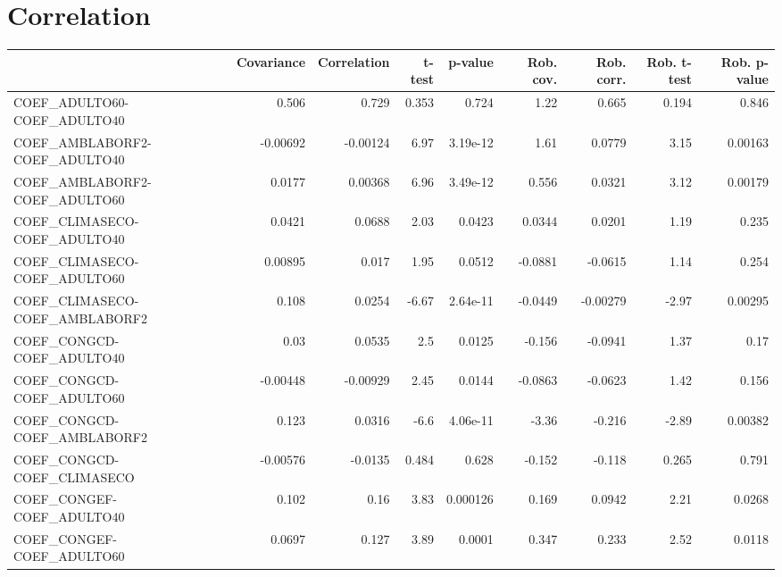 \section{Correlation}
\begin{tabular}{lrrrrrrrr}
\toprule
{} &  Covariance &  Correlation &   t-test &  p-value &  Rob. cov. &  Rob. corr. &  Rob. t-test &  Rob. p-value \\
\midrule
COEF\_ADULTO60-COEF\_ADULTO40           &       0.506 &        0.729 &    0.353 &    0.724 &       1.22 &       0.665 &        0.194 &         0.846 \\
COEF\_AMBLABORF2-COEF\_ADULTO40         &    -0.00692 &     -0.00124 &     6.97 & 3.19e-12 &       1.61 &      0.0779 &         3.15 &       0.00163 \\
COEF\_AMBLABORF2-COEF\_ADULTO60         &      0.0177 &      0.00368 &     6.96 & 3.49e-12 &      0.556 &      0.0321 &         3.12 &       0.00179 \\
COEF\_CLIMASECO-COEF\_ADULTO40          &      0.0421 &       0.0688 &     2.03 &   0.0423 &     0.0344 &      0.0201 &         1.19 &         0.235 \\
COEF\_CLIMASECO-COEF\_ADULTO60          &     0.00895 &        0.017 &     1.95 &   0.0512 &    -0.0881 &     -0.0615 &         1.14 &         0.254 \\
COEF\_CLIMASECO-COEF\_AMBLABORF2        &       0.108 &       0.0254 &    -6.67 & 2.64e-11 &    -0.0449 &    -0.00279 &        -2.97 &       0.00295 \\
COEF\_CONGCD-COEF\_ADULTO40             &        0.03 &       0.0535 &      2.5 &   0.0125 &     -0.156 &     -0.0941 &         1.37 &          0.17 \\
COEF\_CONGCD-COEF\_ADULTO60             &    -0.00448 &     -0.00929 &     2.45 &   0.0144 &    -0.0863 &     -0.0623 &         1.42 &         0.156 \\
COEF\_CONGCD-COEF\_AMBLABORF2           &       0.123 &       0.0316 &     -6.6 & 4.06e-11 &      -3.36 &      -0.216 &        -2.89 &       0.00382 \\
COEF\_CONGCD-COEF\_CLIMASECO            &    -0.00576 &      -0.0135 &    0.484 &    0.628 &     -0.152 &      -0.118 &        0.265 &         0.791 \\
COEF\_CONGEF-COEF\_ADULTO40             &       0.102 &         0.16 &     3.83 & 0.000126 &      0.169 &      0.0942 &         2.21 &        0.0268 \\
COEF\_CONGEF-COEF\_ADULTO60             &      0.0697 &        0.127 &     3.89 &   0.0001 &      0.347 &       0.233 &         2.52 &        0.0118 \\

\end{tabular}

